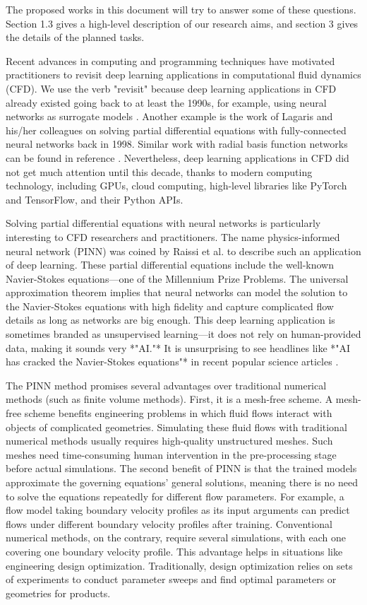 The proposed works in this document will try to answer some of these questions. Section 1.3 gives a high-level description of our research aims, and section 3 gives the details of the planned tasks.

Recent advances in computing and programming techniques have motivated practitioners to revisit deep learning applications in computational fluid dynamics (CFD).
We use the verb "revisit" because deep learning applications in CFD already existed going back to at least the 1990s, for example, using neural networks as surrogate models \cite{Linse1993, Faller1997}.
Another example is the work of Lagaris and his/her colleagues \cite{lagaris_artificial_1998} on solving partial differential equations with fully-connected neural networks back in 1998.
Similar work with radial basis function networks can be found in reference \cite{Li2003}.
Nevertheless, deep learning applications in CFD did not get much attention until this decade, thanks to modern computing technology, including GPUs, cloud computing, high-level libraries like PyTorch and TensorFlow, and their Python APIs.

Solving partial differential equations with neural networks is particularly interesting to CFD researchers and practitioners.
The name physics-informed neural network (PINN) was coined by Raissi et al. \cite{raissi_physics-informed_2019} to describe such an application of deep learning.
These partial differential equations include the well-known Navier-Stokes equations—one of the Millennium Prize Problems.
The universal approximation theorem \cite{hornik_approximation_1991} implies that neural networks can model the solution to the Navier-Stokes equations with high fidelity and capture complicated flow details as long as networks are big enough.
This deep learning application is sometimes branded as unsupervised learning—it does not rely on human-provided data, making it sounds very *"AI."*
It is unsurprising to see headlines like *"AI has cracked the Navier-Stokes equations"* in recent popular science articles \cite{hao_ai_2020}.

The PINN method promises several advantages over traditional numerical methods (such as finite volume methods).
First, it is a mesh-free scheme.
A mesh-free scheme benefits engineering problems in which fluid flows interact with objects of complicated geometries.
Simulating these fluid flows with traditional numerical methods usually requires high-quality unstructured meshes.
Such meshes need time-consuming human intervention in the pre-processing stage before actual simulations.
The second benefit of PINN is that the trained models approximate the governing equations' general solutions, meaning there is no need to solve the equations repeatedly for different flow parameters.
For example, a flow model taking boundary velocity profiles as its input arguments can predict flows under different boundary velocity profiles after training.
Conventional numerical methods, on the contrary, require several simulations, with each one covering one boundary velocity profile.
This advantage helps in situations like engineering design optimization.
Traditionally, design optimization relies on sets of experiments to conduct parameter sweeps and find optimal parameters or geometries for products.

